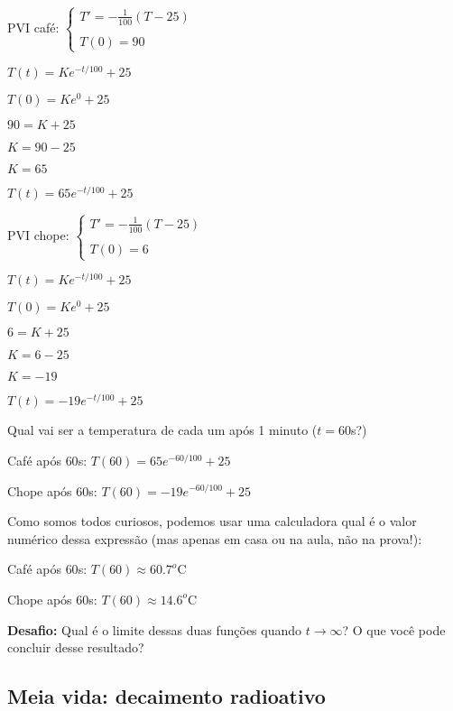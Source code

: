 \documentclass[a4paper]{article}
\begin{document}
\begin{multicols}{2}
PVI café:  $\left\{
    \begin{array}{l}
      T'=-\frac{1}{100}(T-25)\\
      \\
      T(0)=90
    \end{array}
  \right.$

$T(t)=Ke^{-t/100}+25$

$T(0)=Ke^{0}+25$

$90=K+25$

$K= 90 - 25$

$K=65$

$T(t)=65e^{-t/100}+25$

\columnbreak

PVI chope:  $\left\{
    \begin{array}{l}
      T'=-\frac{1}{100}(T-25)\\
      \\
      T(0)=6
    \end{array}
  \right.$

$T(t)=Ke^{-t/100}+25$

$T(0)=Ke^{0}+25$

$6=K+25$

$K= 6 - 25$

$K=-19$

$T(t)=-19e^{-t/100}+25$

\end{multicols}

Qual vai ser a temperatura de cada um após 1 minuto ($t=60$s?)

Café após $60$s: $T(60)=65e^{-60/100}+25$

Chope após $60$s: $T(60)=-19e^{-60/100}+25$

Como somos todos curiosos, podemos usar uma calculadora qual é o valor numérico dessa
expressão (mas apenas em casa ou na aula, não na prova!):

Café após $60$s: $T(60)\approx 60.7^o$C

Chope após $60$s: $T(60)\approx 14.6^o$C

\hrulefill

{\bf Desafio:} Qual é o limite dessas duas funções quando
$t\rightarrow \infty$? O que você pode concluir desse resultado?

\subsection{Meia vida: decaimento radioativo}
\end{document}
